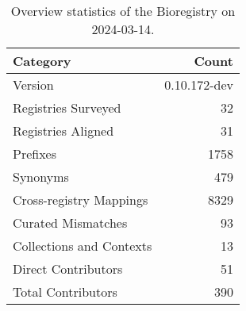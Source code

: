 \begin{table}
\caption{Overview statistics of the Bioregistry on 2024-03-14.}
\label{tab:bioregistry-summary}
\begin{tabular}{lr}
\toprule
Category & Count \\
\midrule
Version & 0.10.172-dev \\
Registries Surveyed & 32 \\
Registries Aligned & 31 \\
Prefixes & 1758 \\
Synonyms & 479 \\
Cross-registry Mappings & 8329 \\
Curated Mismatches & 93 \\
Collections and Contexts & 13 \\
Direct Contributors & 51 \\
Total Contributors & 390 \\
\bottomrule
\end{tabular}
\end{table}
